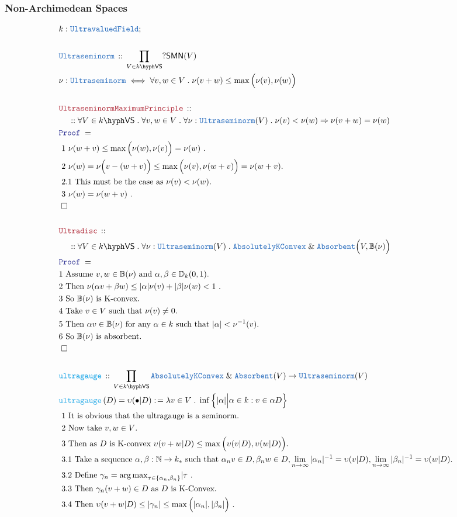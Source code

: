 \documentclass[12pt]{scrartcl}
\newcommand{\TYPE}[1]{\textcolor{NavyBlue}{\mathtt{#1}}}
\newcommand{\FUNC}[1]{\textcolor{Cerulean}{\mathtt{#1}}}
\newcommand{\LOGIC}[1]{\textcolor{Blue}{\mathtt{#1}}}
\newcommand{\THM}[1]{\textcolor{Maroon}{\mathtt{#1}}}
\renewcommand{\.}{\; . \;}
\newcommand{\de}{: \kern 0.1pc =}
\newcommand{\Act}[1]{\left( #1 \right)}
\newcommand{\Theorem}[2]{& \THM{#1} \, :: \, #2 \\ & \Proof = \\ }
\newcommand{\DeclareType}[2]{& \TYPE{#1} \, :: \, #2 \\}
\newcommand{\DefineType}[3]{& #1 : \TYPE{#2} \iff #3 \\}
\newcommand{\DeclareFunc}[2]{& \FUNC{#1} \, :: \, #2 \\}
\newcommand{\DefineNamedFunc}[4]{&  \FUNC{#1}\Act{#2} = #3 \de #4 \\}
\newcommand{\NewLine}{\\ & \kern 1pc}
\newcommand{\Page}[1]{ \begin{align*} #1 \end{align*}   }
\newcommand{\Explain}[1]{& \text{#1.} \\}
\renewcommand{\And}{\; \& \;}
\newcommand{\Imply}{\Rightarrow}
\newcommand{\Nat}{\mathbb{N} }
\newcommand{\QED}{\; \square}
\newcommand{\EndProof}{& \QED \\}
\newcommand{\Proof}{\LOGIC{Proof} \; }
\newcommand{\Cell}{\mathbb{B}}
\newcommand{\Disc}{\mathbb{D}}
\newcommand{\VS}[1]{#1\hyph\mathsf{VS}} %
\newcommand{\AKC}{\TYPE{AbsolutelyKConvex}}
\newcommand{\SMN}{\mathsf{SMN}}
\begin{document}
\subsubsection{Non-Archimedean Spaces}
\Page{
	& k : \TYPE{UltravaluedField}; \\
	\\
	\DeclareType{Ultraseminorm}
	{
		\prod_{V \in \VS{k} }
		?\SMN(V)
	}
	\DefineType{\nu}{Ultraseminorm}
	{
		\forall v,w \in V \. \nu(v + w) \le \max\Big( \nu(v),\nu(w)\Big)	
	}
	\\
	\Theorem{UltraseminormMaximumPrinciple}
	{
		\NewLine ::		
		\forall V \in \VS{k} \.		
		\forall v,w \in V \. 
		\forall \nu : \TYPE{Ultraseminorm}(V) \.
		\nu(v) < \nu(w) \Imply  \nu(v+w) = \nu(w) 
	}
	\Explain{ 1
		$\nu(w + v) \le \max\Big(\nu(w),\nu(v)\Big) = \nu(w)$
	}   
	\Explain{ 2
		$ \nu(w) = \nu\Big(v  - (w + v) \Big) \le \max\Big( \nu(v), \nu(w+v) \Big) = \nu(w + v)$}
	\Explain{ 2.1
		This must be the case as $\nu(v) < \nu(w)$}
	\Explain{ 3
		$\nu(w) = \nu(w + v)$	
	}
	\EndProof
	\\
	\Theorem{Ultradisc}
	{
		\NewLine ::
		\forall V \in \VS{k} \.
		\forall \nu : \TYPE{Ultraseminorm}(V) \.
		\AKC \And \TYPE{Absorbent} \Big(V,\Cell(\nu)\Big)
	}
	\Explain{1 Assume $v,w \in \Cell(\nu)$ and $\alpha,\beta \in \Disc_k(0,1)$}
	\Explain{2 Then 
		$\nu(\alpha v + \beta w) \le |\alpha|\nu(v) + |\beta|\nu(w) < 1$	
	 }
	\Explain{3 So $\Cell(\nu)$ is K-convex}
	\Explain{4 Take $v \in V$ such that $\nu(v) \neq 0$}
	\Explain{5 Then $\alpha v \in \Cell(\nu)$ for any $\alpha \in k$ such that $|\alpha| < \nu^{-1}(v) $}
	\Explain{6 So $\Cell(\nu)$ is absorbent}
	\EndProof
	\\
	\DeclareFunc{ultragauge}
	{
		\prod_{ V \in \VS{k}}
		\AKC \And \TYPE{Absorbent}(V) \to \TYPE{Ultraseminorm}(V) 
	}
	\DefineNamedFunc{ultragauge}{D}{\upsilon(\bullet| D)}
	{
		\lambda v \in V \.  \inf \Big\{ |\alpha| \Big|\alpha \in k : v \in \alpha D  \Big\}
	}
	\Explain{ 1 It is obvious that the ultragauge is a seminorm}
	\Explain{ 2 Now take $v,w \in V$}
	\Explain{ 3  Then as $D$ is K-convex
		$\upsilon(v + w|D) \le \max\Big( \upsilon(v |D),\upsilon(w|D) \Big) $}
	\Explain{ 3.1 Take a sequence $\alpha,\beta : \Nat \to k_*$
		such that $\alpha_n v \in D, \beta_n w \in D, \lim_{n \to \infty} |\alpha_n|^{-1} = \upsilon(v|D),
		\lim_{n\to\infty}|\beta_n|^{-1}=\upsilon(w|D)$}
	\Explain{ 3.2 Define $\gamma_n = {\arg\max}_{\tau \in \{\alpha_n,\beta_n\}} |\tau$  }
	\Explain{ 3.3 Then $\gamma_n(v + w) \in D$ as $D$ is K-Convex}
	\Explain{ 3.4 Then $\upsilon(v + w | D) \le |\gamma_n| \le \max\Big( |\alpha_n|,|\beta_n| \Big)$  }
}
\end{document}
